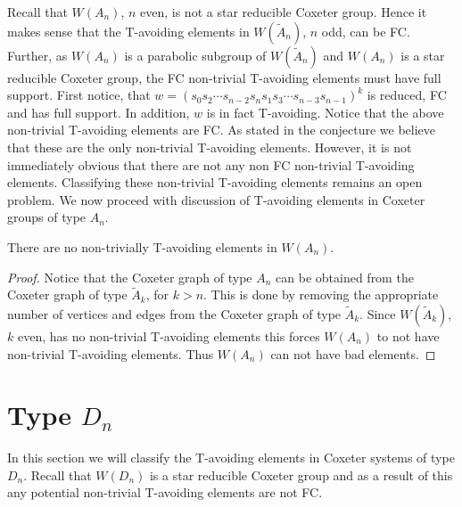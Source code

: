 Recall that $W(A_n)$, $n$ even, is not a star reducible Coxeter group. Hence it makes sense that the T-avoiding elements in $W(\widetilde{A}_n)$, $n$ odd, can be FC. Further, as $W(A_n)$ is a parabolic subgroup of $W(\widetilde{A}_n)$ and $W(A_n)$ is a star reducible Coxeter group, the FC non-trivial T-avoiding elements must have full support. First notice, that $w=(s_0s_2 \cdots s_{n-2}s_ns_1s_3 \cdots s_{n-3}s_{n-1})^k$ is reduced, FC and has full support. In addition, $w$ is in fact T-avoiding. Notice that the above non-trivial T-avoiding elements are FC. As stated in the conjecture we believe that these are the only non-trivial T-avoiding elements. However, it is not immediately obvious that there are not any non FC non-trivial T-avoiding elements. Classifying these non-trivial T-avoiding elements remains an open problem. We now proceed with discussion of T-avoiding elements in Coxeter groups of type $A_n$. 

\begin{corollary}
There are no non-trivially T-avoiding elements in $W(A_n)$. 
\begin{proof}
Notice that the Coxeter graph of type $A_n$ can be obtained from the Coxeter graph of type $\widetilde{A}_k$, for $k > n$. This is done by removing the appropriate number of vertices and edges from the Coxeter graph of type $\widetilde{A}_k$. Since $W(\widetilde{A}_k)$, $k$ even, has no non-trivial T-avoiding elements this forces $W(A_n)$ to not have non-trivial T-avoiding elements. Thus $W(A_n)$ can not have bad elements.  
\end{proof}
\end{corollary}



\section{Type $D_n$}

In this section we will classify the T-avoiding elements in Coxeter systems of type $D_n$. Recall that $W(D_n)$ is a star reducible Coxeter group and as a result of this any potential non-trivial T-avoiding elements are not FC.

